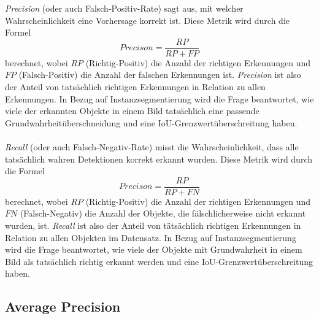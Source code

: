 \textit{Precision} (oder auch Falsch-Positiv-Rate) sagt aus, mit welcher Wahrscheinlichkeit eine Vorhersage korrekt ist. Diese Metrik wird durch die Formel 
\begin{equation}\label{equation:precision}
  Precison = \frac{RP}{RP + FP}
\end{equation}
berechnet, wobei $RP$ (Richtig-Positiv) die Anzahl der richtigen Erkennungen und $FP$ (Falsch-Positiv) die Anzahl der falschen Erkennungen ist.\cite{ref:map} \textit{Precision} ist also der Anteil von tatsächlich richtigen Erkennungen in Relation zu allen Erkennungen. In Bezug auf Instanzsegmentierung wird die Frage beantwortet, wie viele der erkannten Objekte in einem Bild tatsächlich eine passende Grundwahrheitüberschneidung und eine IoU-Grenzwertüberschreitung haben.\cite{ref:jordan}
\\\\
\textit{Recall} (oder auch Falsch-Negativ-Rate) misst die Wahrscheinlichkeit, dass alle tatsächlich wahren Detektionen korrekt erkannt wurden. Diese Metrik wird durch die Formel 
\begin{equation}\label{equation:recall}
  Precison = \frac{RP}{RP + FN}
\end{equation}
berechnet, wobei $RP$ (Richtig-Positiv) die Anzahl der richtigen Erkennungen und $FN$ (Falsch-Negativ) die Anzahl der Objekte, die fälschlicherweise nicht erkannt wurden, ist. \textit{Recall} ist also der Anteil von tätsächlich richtigen Erkennungen in Relation zu allen Objekten im Datensatz.\cite{ref:map} In Bezug auf Instanzsegmentierung wird die Frage beantwortet, wie viele der Objekte mit Grundwahrheit in einem Bild als tatsächlich richtig erkannt werden und eine IoU-Grenzwertüberschreitung haben.\cite{ref:jordan}

\subsection{Average Precision}

